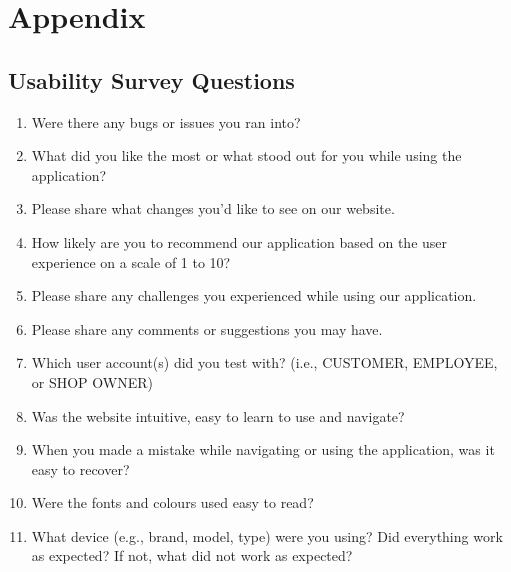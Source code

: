 \documentclass[12pt, titlepage]{article}
\begin{document}
\newpage





\newpage

\section{Appendix}




\subsection{Usability Survey Questions} \label{Usability Survey Questions}

\begin{enumerate}
	\item Were there any bugs or issues you ran into?
	\item What did you like the most or what stood out for you while using the application?
	\item Please share what changes you'd like to see on our website.
	\item How likely are you to recommend our application based on the user experience on a scale of 1 to 10?
	\item Please share any challenges you experienced while using our application.
	\item Please share any comments or suggestions you may have.
	\item Which user account(s) did you test with? (i.e., CUSTOMER, EMPLOYEE, or SHOP OWNER)
	\item Was the website intuitive, easy to learn to use and navigate?
	\item When you made a mistake while navigating or using the application, was it easy to recover?
	\item Were the fonts and colours used easy to read?
	\item What device (e.g., brand, model, type) were you using? Did everything work as expected? If not,
	      what did not work as expected?
\end{enumerate}
\end{document}
